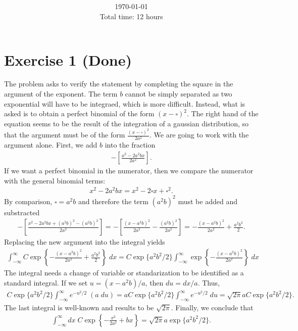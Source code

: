 \documentclass[letterpaper,11pt,twoside]{article}
\title{\textbf{\assignment}\\\course\\{\Large\institution}}
\author{\autor}
\date{\today\\Total time: 12 hours}
\begin{document}
\pagestyle{mainstyle}
\maketitle
\section{Exercise 1 (Done)}%
The problem asks to verify the statement by completing the square in the argument of the exponent. The term $b$ cannot be simply separated as two
exponential will have to be integraed, which is more difficult. Instead, what is asked is to obtain a perfect binomial of the form $(x-\square)^2$.
The right hand of the equation seems to be the result of the integration of a gaussian distribution, so that the argument must be of the form $\frac{(x-\square)^2}{2a^2}$.
We are going to work with the argument alone. First, we add $b$ into the fraction
\begin{align*}
  -\left[\frac{x^2-2a^2bx}{2a^2}\right].
\end{align*}
If we want a perfect binomial in the numerator, then we compare the numerator with the general binomial terms:
\begin{align}
  x^2-2a^2bx = x^2-2\square x+\square^2.
\end{align}
By comparison, $\square=a^2b$ and therefore the term $(a^2b)^2$ must be added and substracted
\begin{align*}
  -\left[\frac{x^2-2a^2bx+(a^2b)^2-(a^2b)^2}{2a^2}\right]=-\left[\frac{(x-a^2b)^2}{2a^2}-\frac{(a^2b)^2}{2a^2}\right]=-\frac{(x-a^2b)^2}{2a^2}+\frac{a^2b^2}{2}.
\end{align*}
Replacing the new argument into the integral yields
\begin{align*}
  \int_{-\infty}^\infty C\exp\left\{-\frac{(x-a^2b)^2}{2a^2}+\frac{a^2b^2}{2}\right\}\;dx=C\exp\{a^2b^2/2\}\int_{-\infty}^\infty\exp\left\{-\frac{(x-a^2b)^2}{2a^2}\right\}\;dx
\end{align*}
The integral needs a change of variable or standarization to be identified as a standard integral. If we set $u=(x-a^2b)/a$, then $du=dx/a$. Thus,
\begin{align*}
  C\exp\{a^2b^2/2\}\int_{-\infty}^\infty e^{-u^2/2}\;\left(a\;du\right)=aC\exp\{a^2b^2/2\}\int_{-\infty}^\infty e^{-u^2/2}\;du=\sqrt{2\pi}aC\exp\{a^2b^2/2\}.
\end{align*}
The last integral is well-known and results to be $\sqrt{2\pi}$. Finally, we conclude that 
\begin{align}
  \int_{-\infty}^\infty dx\;C\exp\left\{-\frac{x^2}{2a^2}+bx\right\}=\sqrt{2\pi}a\exp\{a^2b^2/2\}.
\end{align}
\end{document}
